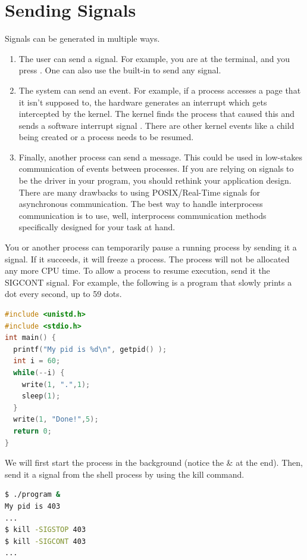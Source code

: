 \section{Sending Signals}

Signals can be generated in multiple ways.
\begin{enumerate}
\item The user can send a signal.
  For example, you are at the terminal, and you press .
  One can also use the built-in  to send any signal.
\item The system can send an event.
For example, if a process accesses a page that it isn't supposed to, the hardware generates an interrupt which gets intercepted by the kernel.
The kernel finds the process that caused this and sends a software interrupt signal .
There are other kernel events like a child being created or a process needs to be resumed.

\item Finally, another process can send a message.
  This could be used in low-stakes communication of events between processes.
  If you are relying on signals to be the driver in your program, you should rethink your application design.
  There are many drawbacks to using POSIX/Real-Time signals for asynchronous communication.
  The best way to handle interprocess communication is to use, well, interprocess communication methods specifically designed for your task at hand.
\end{enumerate}

You or another process can temporarily pause a running process by sending it a  signal.
If it succeeds, it will freeze a process.
The process will not be allocated any more CPU time.
To allow a process to resume execution, send it the SIGCONT signal.
For example, the following is a program that slowly prints a dot every second, up to 59 dots.

\begin{lstlisting}[language=C]
#include <unistd.h>
#include <stdio.h>
int main() {
  printf("My pid is %d\n", getpid() );
  int i = 60;
  while(--i) {
    write(1, ".",1);
    sleep(1);
  }
  write(1, "Done!",5);
  return 0;
}
\end{lstlisting}

We will first start the process in the background (notice the \& at the end).
Then, send it a signal from the shell process by using the kill command.

\begin{lstlisting}[language=bash]
$ ./program &
My pid is 403
...
$ kill -SIGSTOP 403
$ kill -SIGCONT 403
...
\end{lstlisting}

